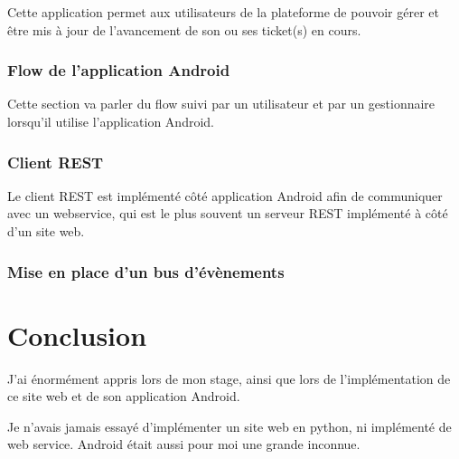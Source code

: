 \documentclass[12pt,table,a4paper]{report}
\begin{document}
Cette application permet aux utilisateurs de la plateforme de pouvoir gérer et être mis à jour de l'avancement de son ou ses ticket(s) en cours.

\subsection{Flow de l'application Android}
Cette section va parler du flow suivi par un utilisateur et par un gestionnaire lorsqu'il utilise l'application Android.

\subsection{Client REST}
Le client REST est implémenté côté application Android afin de communiquer avec un webservice, qui est le plus souvent un serveur REST implémenté à côté d'un site web.

\subsection{Mise en place d'un bus d'évènements}

\chapter{Conclusion}
J'ai énormément appris lors de mon stage, ainsi que lors de l'implémentation de ce site web et de son application Android.

Je n'avais jamais essayé d'implémenter un site web en python, ni implémenté de web service. Android était aussi pour moi une grande inconnue.
\end{document}
